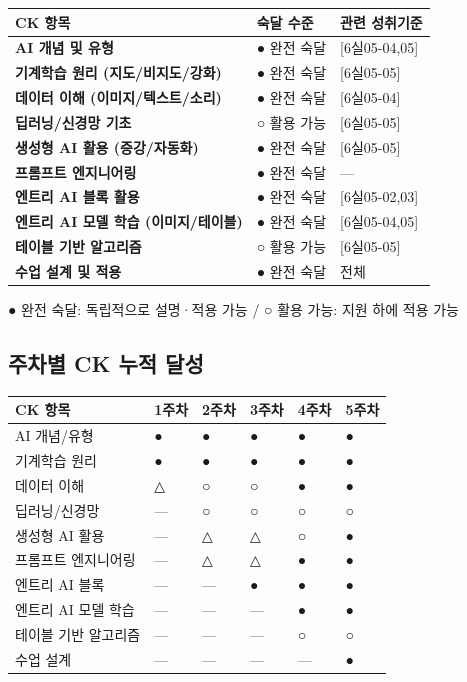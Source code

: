 \documentclass[a4paper,11pt]{article}
\begin{document}
{\small\noindent
\begin{tabularx}{\textwidth}{|X|>{\centering\arraybackslash}p{2cm}|>{\centering\arraybackslash}p{2.5cm}|}
\hline
\textbf{CK 항목} & \textbf{숙달 수준} & \textbf{관련 성취기준} \\ \hline
\textbf{AI 개념 및 유형} & ● 완전 숙달 & {[6실05-04,05]} \\ \hline
\textbf{기계학습 원리 (지도/비지도/강화)} & ● 완전 숙달 & {[6실05-05]} \\ \hline
\textbf{데이터 이해 (이미지/텍스트/소리)} & ● 완전 숙달 & {[6실05-04]} \\ \hline
\textbf{딥러닝/신경망 기초} & ○ 활용 가능 & {[6실05-05]} \\ \hline
\textbf{생성형 AI 활용 (증강/자동화)} & ● 완전 숙달 & {[6실05-05]} \\ \hline
\textbf{프롬프트 엔지니어링} & ● 완전 숙달 & --- \\ \hline
\textbf{엔트리 AI 블록 활용} & ● 완전 숙달 & {[6실05-02,03]} \\ \hline
\textbf{엔트리 AI 모델 학습 (이미지/테이블)} & ● 완전 숙달 & {[6실05-04,05]} \\ \hline
\textbf{테이블 기반 알고리즘} & ○ 활용 가능 & {[6실05-05]} \\ \hline
\textbf{수업 설계 및 적용} & ● 완전 숙달 & 전체 \\ \hline
\end{tabularx}
}

\begin{quoteblock}
● 완전 숙달: 독립적으로 설명·적용 가능 / ○ 활용 가능: 지원 하에 적용 가능
\end{quoteblock}

\subsection{주차별 CK 누적 달성}

{\small\noindent
\begin{tabularx}{\textwidth}{|X|>{\centering\arraybackslash}p{1cm}|>{\centering\arraybackslash}p{1cm}|>{\centering\arraybackslash}p{1cm}|>{\centering\arraybackslash}p{1cm}|>{\centering\arraybackslash}p{1cm}|}
\hline
\textbf{CK 항목} & \textbf{1주차} & \textbf{2주차} & \textbf{3주차} & \textbf{4주차} & \textbf{5주차} \\ \hline
AI 개념/유형 & ● & ● & ● & ● & ● \\ \hline
기계학습 원리 & ● & ● & ● & ● & ● \\ \hline
데이터 이해 & △ & ○ & ○ & ● & ● \\ \hline
딥러닝/신경망 & --- & ○ & ○ & ○ & ○ \\ \hline
생성형 AI 활용 & --- & △ & △ & ○ & ● \\ \hline
프롬프트 엔지니어링 & --- & △ & △ & ● & ● \\ \hline
엔트리 AI 블록 & --- & --- & ● & ● & ● \\ \hline
엔트리 AI 모델 학습 & --- & --- & --- & ● & ● \\ \hline
테이블 기반 알고리즘 & --- & --- & --- & ○ & ○ \\ \hline
수업 설계 & --- & --- & --- & --- & ● \\ \hline
\end{tabularx}
}
\end{document}
